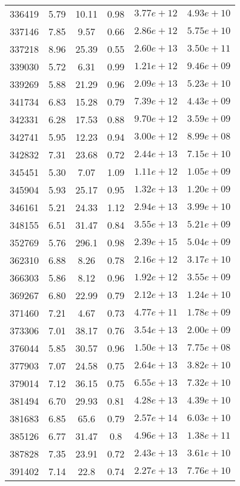 \begin{table}
\begin{tabular}{cccccc}
336419 & 5.79 & 10.11 & 0.98 & $3.77e+12$ & $4.93e+10$ \\
337146 & 7.85 & 9.57 & 0.66 & $2.86e+12$ & $5.75e+10$ \\
337218 & 8.96 & 25.39 & 0.55 & $2.60e+13$ & $3.50e+11$ \\
339030 & 5.72 & 6.31 & 0.99 & $1.21e+12$ & $9.46e+09$ \\
339269 & 5.88 & 21.29 & 0.96 & $2.09e+13$ & $5.23e+10$ \\
341734 & 6.83 & 15.28 & 0.79 & $7.39e+12$ & $4.43e+09$ \\
342331 & 6.28 & 17.53 & 0.88 & $9.70e+12$ & $3.59e+09$ \\
342741 & 5.95 & 12.23 & 0.94 & $3.00e+12$ & $8.99e+08$ \\
342832 & 7.31 & 23.68 & 0.72 & $2.44e+13$ & $7.15e+10$ \\
345451 & 5.30 & 7.07 & 1.09 & $1.11e+12$ & $1.05e+09$ \\
345904 & 5.93 & 25.17 & 0.95 & $1.32e+13$ & $1.20e+09$ \\
346161 & 5.21 & 24.33 & 1.12 & $2.94e+13$ & $3.99e+10$ \\
348155 & 6.51 & 31.47 & 0.84 & $3.55e+13$ & $5.21e+09$ \\
352769 & 5.76 & 296.1 & 0.98 & $2.39e+15$ & $5.04e+09$ \\
362310 & 6.88 & 8.26 & 0.78 & $2.16e+12$ & $3.17e+10$ \\
366303 & 5.86 & 8.12 & 0.96 & $1.92e+12$ & $3.55e+09$ \\
369267 & 6.80 & 22.99 & 0.79 & $2.12e+13$ & $1.24e+10$ \\
371460 & 7.21 & 4.67 & 0.73 & $4.77e+11$ & $1.78e+09$ \\
373306 & 7.01 & 38.17 & 0.76 & $3.54e+13$ & $2.00e+09$ \\
376044 & 5.85 & 30.57 & 0.96 & $1.50e+13$ & $7.75e+08$ \\
377903 & 7.07 & 24.58 & 0.75 & $2.64e+13$ & $3.82e+10$ \\
379014 & 7.12 & 36.15 & 0.75 & $6.55e+13$ & $7.32e+10$ \\
381494 & 6.70 & 29.93 & 0.81 & $4.28e+13$ & $4.39e+10$ \\
381683 & 6.85 & 65.6 & 0.79 & $2.57e+14$ & $6.03e+10$ \\
385126 & 6.77 & 31.47 & 0.8 & $4.96e+13$ & $1.38e+11$ \\
387828 & 7.35 & 23.91 & 0.72 & $2.43e+13$ & $3.61e+10$ \\
391402 & 7.14 & 22.8 & 0.74 & $2.27e+13$ & $7.76e+10$ \\

\end{tabular}
\end{table}
